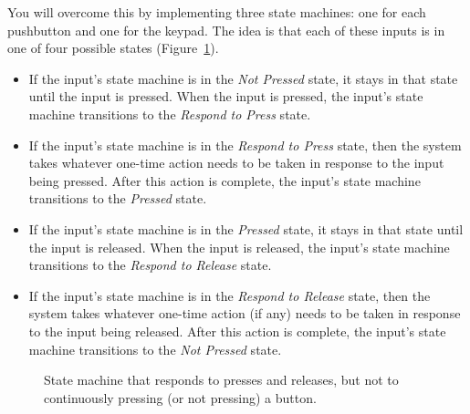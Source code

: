 You will overcome this by implementing three state machines: one for each pushbutton and one for the keypad.
The idea is that each of these inputs is in one of four possible states (Figure~\ref{fig:buttonStateMachine}).
\begin{itemize}
    \item If the input's state machine is in the \textit{Not Pressed} state, it stays in that state until the input is pressed.
        When the input is pressed, the input's state machine transitions to the \textit{Respond to Press} state.
    \item If the input's state machine is in the \textit{Respond to Press} state, then the system takes whatever one-time action needs to be taken in response to the input being pressed.
        After this action is complete, the input's state machine transitions to the \textit{Pressed} state.
    \item If the input's state machine is in the \textit{Pressed} state, it stays in that state until the input is released.
        When the input is released, the input's state machine transitions to the \textit{Respond to Release} state.
    \item If the input's state machine is in the \textit{Respond to Release} state, then the system takes whatever one-time action (if any) needs to be taken in response to the input being released.
        After this action is complete, the input's state machine transitions to the \textit{Not Pressed} state.
\end{itemize}

\begin{figure}%
    \centering
    \caption{State machine that responds to presses and releases, but not to continuously pressing (or not pressing) a button. \label{fig:buttonStateMachine}}
\end{figure}

